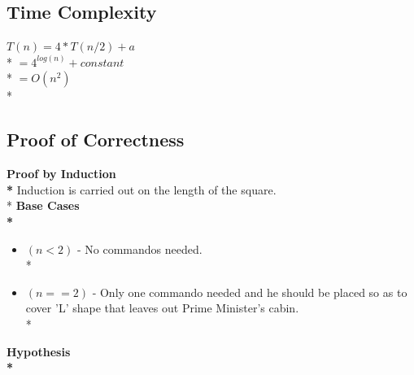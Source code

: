 \documentclass{article}
\begin{document}
\begin{itemize}
\subsection{Time Complexity}
\begin{center}
$ T(n) = 4*T(n/2) + a $ \\*
$ = 4^{log(n)} + constant $ \\*
$ = O(n^2) $ \\*
\end{center}
\subsection{Proof of Correctness}
{\bf Proof by Induction \\*}
Induction is carried out on the length of the square. \\*
{\bf Base Cases \\*}
\begin{itemize}
\item $(n<2)$ - No commandos needed. \\*
\item $(n==2)$ - Only one commando needed and he should be placed so as to cover 'L' shape that leaves out Prime Minister's cabin. \\*
\end{itemize}
{\bf Hypothesis \\*}

\end{itemize}
\end{document}
